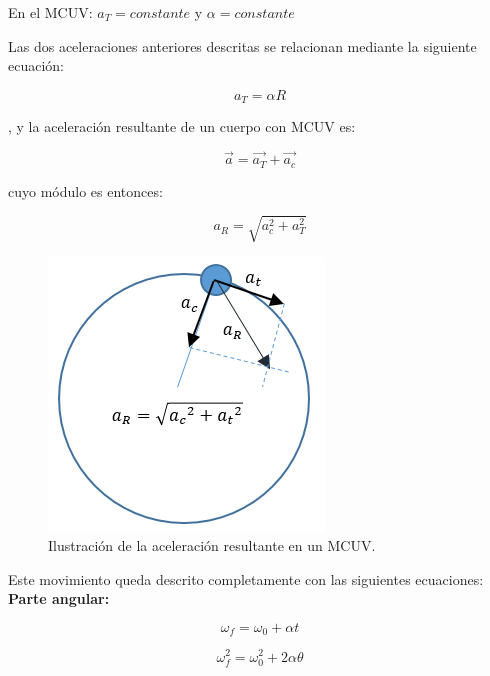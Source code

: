 \documentclass[a5paper,pagesize,10pt,bibtotoc,pointlessnumbers,
normalheadings,DIV=9,fleqn,x11names,table,twoside=false]{scrbook}
\begin{document}
\begin{tcolorbox}
En el MCUV: $a_T = constante$ y $\alpha = constante$
\end{tcolorbox}

Las dos aceleraciones anteriores descritas se relacionan mediante la siguiente ecuación:

\begin{equation}
a_T = \alpha R
\end{equation} 

, y la aceleración resultante de un cuerpo con MCUV es:

\begin{equation}
\vec{a} = \vec{a_T}+\vec{a_c}
\end{equation}

cuyo módulo es entonces:

\begin{equation}
a_R =\sqrt{a_c^2+a_T^2} 
\end{equation}

\begin{figure}[ht]
 \centering
 \includegraphics[scale=0.5]{images/aceleracion-resultante.png}
 \caption{Ilustración de la aceleración resultante en un MCUV.}\label{ac}
\end{figure} 
 
Este movimiento queda descrito completamente con las siguientes ecuaciones:\\

\textbf{Parte angular:}

\begin{equation}
\omega_f = \omega_0 + \alpha t
\end{equation}

\begin{equation}
\omega_f^2 = \omega_0^2 + 2\alpha\theta
\end{equation}
\end{document}
